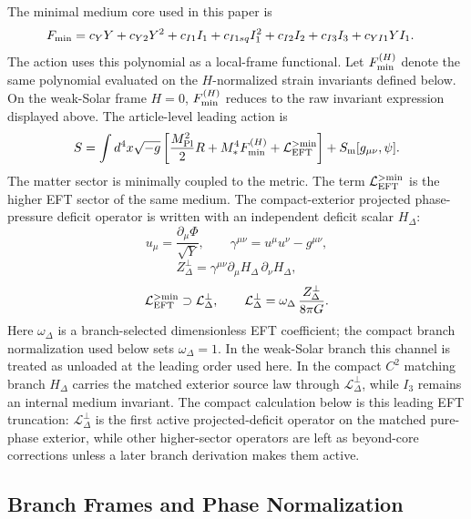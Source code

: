 \documentclass[12pt,a4paper]{article}
\begin{document}
The minimal medium core used in this paper is
\begin{align*}
F_{\rm min}={}&
c_Y Y+c_{Y2}Y^2+c_{I1}I_1+c_{I1sq}I_1^2+c_{I2}I_2+c_{I3}I_3
+c_{YI1}YI_1.
\end{align*}
The action uses this polynomial as a local-frame functional.  Let
$F_{\rm min}^{(H)}$ denote the same polynomial evaluated on the
$H$-normalized strain invariants defined below.  On the weak-Solar frame
$H=0$, $F_{\rm min}^{(H)}$ reduces to the raw invariant expression displayed
above.
The article-level leading action is
\begin{align*}
S=\int d^4x\sqrt{-g}\left[
\frac{M_{\rm Pl}^2}{2}R+M_*^4 F_{\rm min}^{(H)}
+\mathcal L_{\rm EFT}^{>{\rm min}}
\right]+S_{\rm m}[g_{\mu\nu},\psi].
\end{align*}
The matter sector is minimally coupled to the metric. The term
$\mathcal L_{\rm EFT}^{>{\rm min}}$ is the higher EFT sector of the same
medium. The compact-exterior projected phase-pressure deficit operator is
written with an independent deficit scalar $H_\Delta$:
\[
u_\mu=\frac{\partial_\mu\Phi}{\sqrt Y},\qquad
\gamma^{\mu\nu}=u^\mu u^\nu-g^{\mu\nu},
\]
\[
Z_\Delta^\perp=
\gamma^{\mu\nu}\partial_\mu H_\Delta\,\partial_\nu H_\Delta,
\]
\[
\mathcal L_{\rm EFT}^{>{\rm min}}\supset
\mathcal L_\Delta^\perp,\qquad
\mathcal L_\Delta^\perp=
\omega_\Delta\,\frac{Z_\Delta^\perp}{8\pi G}.
\]
Here $\omega_\Delta$ is a branch-selected dimensionless EFT coefficient; the
compact branch normalization used below sets $\omega_\Delta=1$. In the
weak-Solar branch this channel is treated as unloaded at the leading order used
here. In the compact $C^2$ matching branch
$H_\Delta$ carries the matched exterior source law through
$\mathcal L_\Delta^\perp$, while $I_3$ remains an internal medium invariant.
The compact calculation below is this leading EFT truncation:
$\mathcal L_\Delta^\perp$ is the first active projected-deficit operator on the
matched pure-phase exterior, while other higher-sector operators are left as
beyond-core corrections unless a later branch derivation makes them active.

\subsection{Branch Frames and Phase Normalization}
\end{document}
